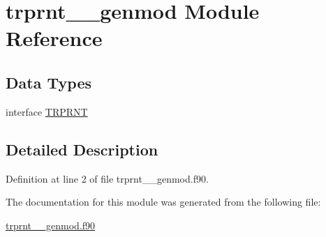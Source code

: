 \hypertarget{classtrprnt____genmod}{\section{trprnt\+\_\+\+\_\+genmod Module Reference}
\label{classtrprnt____genmod}
}
\subsection*{Data Types}
\begin{DoxyCompactItemize}
\item 
interface \hyperlink{interfacetrprnt____genmod_1_1TRPRNT}{T\+R\+P\+R\+N\+T}
\end{DoxyCompactItemize}


\subsection{Detailed Description}


Definition at line 2 of file trprnt\+\_\+\+\_\+genmod.\+f90.



The documentation for this module was generated from the following file\+:\begin{DoxyCompactItemize}
\item 
\hyperlink{trprnt____genmod_8f90}{trprnt\+\_\+\+\_\+genmod.\+f90}\end{DoxyCompactItemize}
